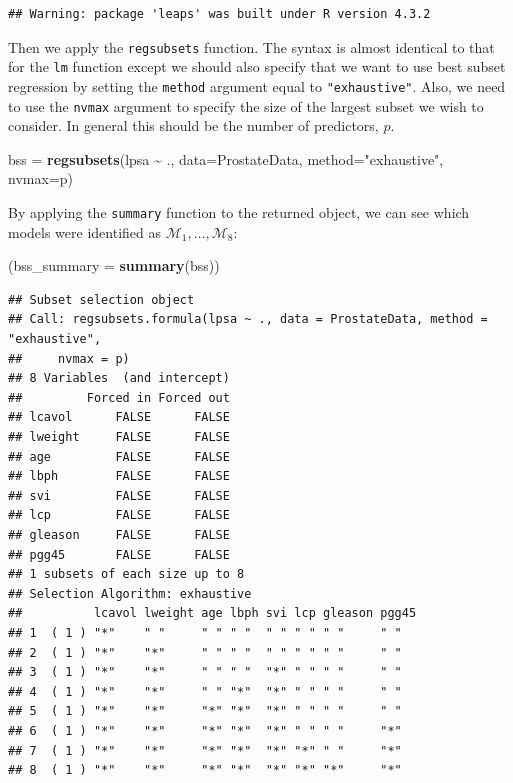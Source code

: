 \documentclass[
]{article}
\newenvironment{Shaded}{\begin{snugshade}}{\end{snugshade}}
\newcommand{\AttributeTok}[1]{\textcolor[rgb]{0.13,0.29,0.53}{#1}}
\newcommand{\FunctionTok}[1]{\textcolor[rgb]{0.13,0.29,0.53}{\textbf{#1}}}
\newcommand{\NormalTok}[1]{#1}
\newcommand{\OtherTok}[1]{\textcolor[rgb]{0.56,0.35,0.01}{#1}}
\newcommand{\SpecialCharTok}[1]{\textcolor[rgb]{0.81,0.36,0.00}{\textbf{#1}}}
\newcommand{\StringTok}[1]{\textcolor[rgb]{0.31,0.60,0.02}{#1}}
\begin{document}
\begin{verbatim}
## Warning: package 'leaps' was built under R version 4.3.2
\end{verbatim}

Then we apply the \texttt{regsubsets} function. The syntax is almost
identical to that for the \texttt{lm} function except we should also
specify that we want to use best subset regression by setting the
\texttt{method} argument equal to \texttt{"exhaustive"}. Also, we need
to use the \texttt{nvmax} argument to specify the size of the largest
subset we wish to consider. In general this should be the number of
predictors, \(p\).

\begin{Shaded}
\begin{Highlighting}[]
\NormalTok{bss }\OtherTok{=} \FunctionTok{regsubsets}\NormalTok{(lpsa }\SpecialCharTok{\textasciitilde{}}\NormalTok{ ., }\AttributeTok{data=}\NormalTok{ProstateData, }\AttributeTok{method=}\StringTok{"exhaustive"}\NormalTok{, }\AttributeTok{nvmax=}\NormalTok{p)}
\end{Highlighting}
\end{Shaded}

By applying the \texttt{summary} function to the returned object, we can
see which models were identified as
\(\mathcal{M}_1, \ldots, \mathcal{M}_8\):

\begin{Shaded}
\begin{Highlighting}[]
\NormalTok{(}\AttributeTok{bss\_summary =} \FunctionTok{summary}\NormalTok{(bss))}
\end{Highlighting}
\end{Shaded}

\begin{verbatim}
## Subset selection object
## Call: regsubsets.formula(lpsa ~ ., data = ProstateData, method = "exhaustive", 
##     nvmax = p)
## 8 Variables  (and intercept)
##         Forced in Forced out
## lcavol      FALSE      FALSE
## lweight     FALSE      FALSE
## age         FALSE      FALSE
## lbph        FALSE      FALSE
## svi         FALSE      FALSE
## lcp         FALSE      FALSE
## gleason     FALSE      FALSE
## pgg45       FALSE      FALSE
## 1 subsets of each size up to 8
## Selection Algorithm: exhaustive
##          lcavol lweight age lbph svi lcp gleason pgg45
## 1  ( 1 ) "*"    " "     " " " "  " " " " " "     " "  
## 2  ( 1 ) "*"    "*"     " " " "  " " " " " "     " "  
## 3  ( 1 ) "*"    "*"     " " " "  "*" " " " "     " "  
## 4  ( 1 ) "*"    "*"     " " "*"  "*" " " " "     " "  
## 5  ( 1 ) "*"    "*"     "*" "*"  "*" " " " "     " "  
## 6  ( 1 ) "*"    "*"     "*" "*"  "*" " " " "     "*"  
## 7  ( 1 ) "*"    "*"     "*" "*"  "*" "*" " "     "*"  
## 8  ( 1 ) "*"    "*"     "*" "*"  "*" "*" "*"     "*"
\end{verbatim}
\end{document}
